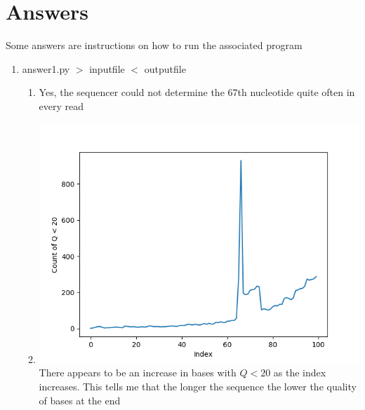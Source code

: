 \documentclass[12pt]{article}
\begin{document}
\maketitle

\section*{Answers}
Some answers are instructions on how to run the associated program
\begin{enumerate}
    \item answer1.py $>$ inputfile $<$ outputfile
    \begin{enumerate}[label=(\alph*)]
            \item Yes, the sequencer could not determine the 67th nucleotide quite often in every read
            \item
            \includegraphics[scale=0.651]{trend.png} 
            \\There appears to be an increase in bases with $Q < 20$ as the index increases. This tells me that the 
            longer the sequence the lower the quality of bases at the end
            

\end{enumerate}
\end{enumerate}
\end{document}

